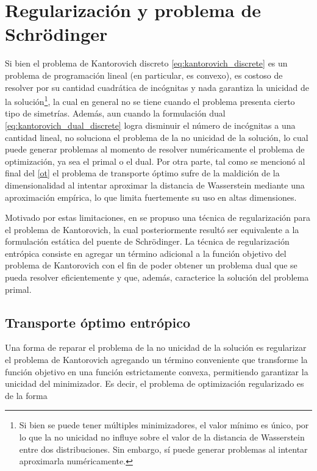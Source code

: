 \chapter{Regularización y problema de Schrödinger}
\label{eot_sbp}

Si bien el problema de Kantorovich discreto \eqref{eq:kantorovich_discrete} es un problema de programación lineal (en particular, es convexo), es costoso de resolver por su cantidad cuadrática de incógnitas y nada garantiza la unicidad de la solución\footnote{Si bien se puede tener múltiples minimizadores, el valor mínimo es único, por lo que la no unicidad no influye sobre el valor de la distancia de Wasserstein entre dos distribuciones. Sin embargo, sí puede generar problemas al intentar aproximarla numéricamente.}, la cual en general no se tiene cuando el problema presenta cierto tipo de simetrías. Además, aun cuando la formulación dual \eqref{eq:kantorovich_dual_discrete} logra disminuir el número de incógnitas a una cantidad lineal, no soluciona el problema de la no unicidad de la solución, lo cual puede generar problemas al momento de resolver numéricamente el problema de optimización, ya sea el primal o el dual. Por otra parte, tal como se mencionó al final del \autoref{ot} el problema de transporte óptimo sufre de la maldición de la dimensionalidad al intentar aproximar la distancia de Wasserstein mediante una aproximación empírica, lo que limita fuertemente su uso en altas dimensiones.

Motivado por estas limitaciones, en \cite{cuturi2013sinkhorn} se propuso una técnica de regularización para el problema de Kantorovich, la cual posteriormente resultó ser equivalente a la formulación estática del puente de Schrödinger. La técnica de regularización entrópica consiste en agregar un término adicional a la función objetivo del problema de Kantorovich con el fin de poder obtener un problema dual que se pueda resolver eficientemente y que, además, caracterice la solución del problema primal.

\section{Transporte óptimo entrópico}
\label{eot_sbp/regularized}

Una forma de reparar el problema de la no unicidad de la solución es regularizar el problema de Kantorovich agregando un término conveniente que transforme la función objetivo en una función estrictamente convexa, permitiendo garantizar la unicidad del minimizador. Es decir, el problema de optimización regularizado es de la forma

